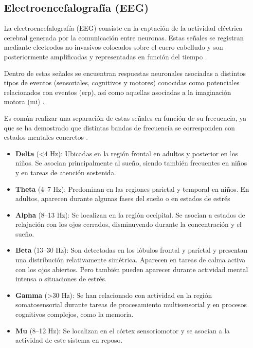 
\subsection{Electroencefalografía (EEG)}\label{sec:eeg}

La electroencefalografía (EEG) consiste en la captación de la actividad eléctrica cerebral generada por la comunicación entre neuronas. Estas señales se registran mediante electrodos no invasivos colocados sobre el cuero cabelludo y son posteriormente amplificadas y representadas en función del tiempo \cite{luck_IntroductionEventRelated2014,sherman_EEGSignal2020}.

Dentro de estas señales se encuentran respuestas neuronales asociadas a distintos tipos de eventos (sensoriales, cognitivos y motores) conocidas como potenciales relacionados con eventos (\acrshort{erp}), así como aquellas asociadas a la imaginación motora (\acrshort{mi}) \cite{luck_IntroductionEventRelated2014,jiang_ComprehensiveReview2026}.

Es común realizar una separación de estas señales en función de su frecuencia, ya que se ha demostrado que distintas bandas de frecuencia se corresponden con estados mentales concretos \cite{sherman_EEGSignal2020,roohi-azizi_ChangesBrains2017}.

\begin{itemize}
    \item \textbf{Delta} (\textless4 Hz): Ubicadas en la región frontal en adultos y posterior en los niños. Se asocian principalmente al sueño, siendo también frecuentes en niños y en tareas de atención sostenida.

    \item \textbf{Theta} (4--7 Hz): Predominan en las regiones parietal y temporal en niños. En adultos, aparecen durante algunas fases del sueño o en estados de estrés

    \item \textbf{Alpha} (8--13 Hz): Se localizan en la región occipital. Se asocian a estados de relajación con los ojos cerrados, disminuyendo durante la concentración y el sueño.

    \item \textbf{Beta} (13--30 Hz): Son detectadas en los lóbulos frontal y parietal y presentan una distribución relativamente simétrica. Aparecen en tareas de calma activa con los ojos abiertos. Pero también pueden aparecer durante actividad mental intensa o situaciones de estrés.

    \item \textbf{Gamma} (\textgreater30 Hz): Se han relacionado con actividad en la región somatosensorial durante tareas de procesamiento multisensorial y en procesos cognitivos complejos, como la memoria.

    \item \textbf{Mu} (8--12 Hz): Se localizan en el córtex sensoriomotor y se asocian a la actividad de este sistema en reposo.
\end{itemize}

